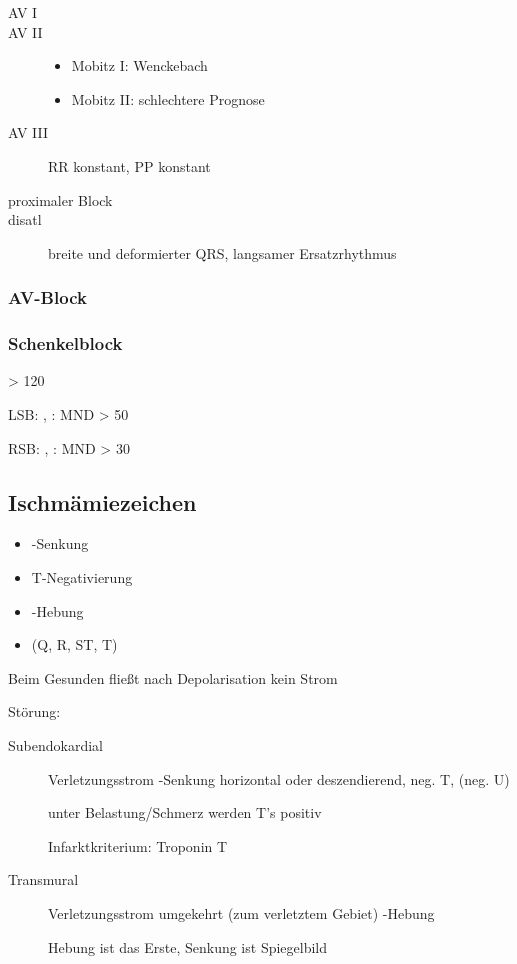 \begin{description}
  \item[AV I{\textdegree}]
  \item[AV II{\textdegree}] 
  \begin{itemize}
    \item Mobitz I: Wenckebach
    \item Mobitz II: schlechtere Prognose
  \end{itemize}
  \item[AV III{\textdegree}] RR konstant, PP konstant
  \item[proximaler Block]
  \item[disatl] breite und deformierter QRS, langsamer Ersatzrhythmus
\end{description}


\subsubsection{AV-Block}

\subsubsection{Schenkelblock}


> 120

LSB: , : MND > 50

RSB: , : MND > 30


\subsection{Ischmämiezeichen}

\begin{itemize}
  \item {}-Senkung
  \item T-Negativierung
  \item {}-Hebung
  \item (Q, R, ST, T)
\end{itemize}

Beim Gesunden fließt nach Depolarisation kein Strom

Störung: 

\begin{description}
  \item[Subendokardial] Verletzungsstrom  -Senkung horizontal oder deszendierend, neg. T, (neg. U)
  
   unter Belastung/Schmerz werden T's positiv
  
  Infarktkriterium: Troponin T
  \item[Transmural] Verletzungsstrom umgekehrt (zum verletztem Gebiet)  -Hebung
  
  Hebung ist das Erste, Senkung ist Spiegelbild
\end{description}

